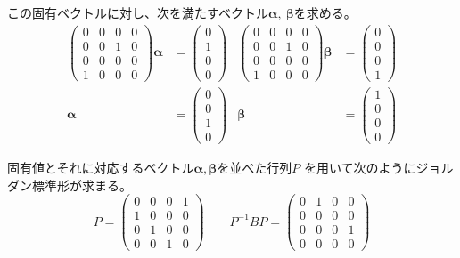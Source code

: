 \documentclass[12pt,b5paper]{ltjsarticle}
\begin{document}
\begin{enumerate}
      この固有ベクトルに対し、次を満たすベクトル$\bm{\alpha},\ \bm{\beta}$を求める。
      \begin{align}
       \begin{pmatrix}
        0&0&0&0\\0&0&1&0\\0&0&0&0\\1&0&0&0
       \end{pmatrix}
       \bm{\alpha}&=\begin{pmatrix}0\\1\\0\\0\end{pmatrix}
       &
       \begin{pmatrix}
        0&0&0&0\\0&0&1&0\\0&0&0&0\\1&0&0&0
       \end{pmatrix}
       \bm{\beta}&=\begin{pmatrix}0\\0\\0\\1\end{pmatrix}\\
       \bm{\alpha}&=\begin{pmatrix}0\\0\\1\\0\end{pmatrix}
       &
       \bm{\beta}&=\begin{pmatrix}1\\0\\0\\0\end{pmatrix}
      \end{align}


      固有値とそれに対応するベクトル$\bm{\alpha},\bm{\beta}$を並べた行列$P$
      を用いて次のようにジョルダン標準形が求まる。
      \begin{equation}
       P=
        \begin{pmatrix}0&0&0&1\\1&0&0&0\\0&1&0&0\\0&0&1&0\end{pmatrix}
        \qquad
         P^{-1}BP=
         \begin{pmatrix}0&1&0&0\\0&0&0&0\\0&0&0&1\\0&0&0&0\end{pmatrix}
      \end{equation}



\end{enumerate}
\end{document}

